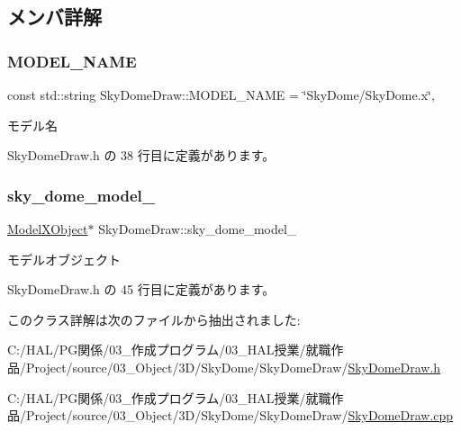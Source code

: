 \subsection{メンバ詳解}
\mbox{\label{class_sky_dome_draw_a366fd9d1040d77ddac71e335f10f2c29}} 
\subsubsection{\texorpdfstring{M\+O\+D\+E\+L\+\_\+\+N\+A\+ME}{MODEL\_NAME}}
{\footnotesize\ttfamily const std\+::string Sky\+Dome\+Draw\+::\+M\+O\+D\+E\+L\+\_\+\+N\+A\+ME = \char`\"{}Sky\+Dome/Sky\+Dome.\+x\char`\"{}\hspace{0.3cm}{\ttfamily [static]}, {\ttfamily [private]}}



モデル名 



 Sky\+Dome\+Draw.\+h の 38 行目に定義があります。

\mbox{\label{class_sky_dome_draw_a2453fb04f979443c61acc10eafa183aa}} 
\subsubsection{\texorpdfstring{sky\+\_\+dome\+\_\+model\+\_\+}{sky\_dome\_model\_}}
{\footnotesize\ttfamily \mbox{\hyperlink{class_model_x_object}{Model\+X\+Object}}$\ast$ Sky\+Dome\+Draw\+::sky\+\_\+dome\+\_\+model\+\_\+\hspace{0.3cm}{\ttfamily [private]}}



モデルオブジェクト 



 Sky\+Dome\+Draw.\+h の 45 行目に定義があります。



このクラス詳解は次のファイルから抽出されました\+:\begin{DoxyCompactItemize}
\item 
C\+:/\+H\+A\+L/\+P\+G関係/03\+\_\+作成プログラム/03\+\_\+\+H\+A\+L授業/就職作品/\+Project/source/03\+\_\+\+Object/3\+D/\+Sky\+Dome/\+Sky\+Dome\+Draw/\mbox{\hyperlink{_sky_dome_draw_8h}{Sky\+Dome\+Draw.\+h}}\item 
C\+:/\+H\+A\+L/\+P\+G関係/03\+\_\+作成プログラム/03\+\_\+\+H\+A\+L授業/就職作品/\+Project/source/03\+\_\+\+Object/3\+D/\+Sky\+Dome/\+Sky\+Dome\+Draw/\mbox{\hyperlink{_sky_dome_draw_8cpp}{Sky\+Dome\+Draw.\+cpp}}\end{DoxyCompactItemize}

